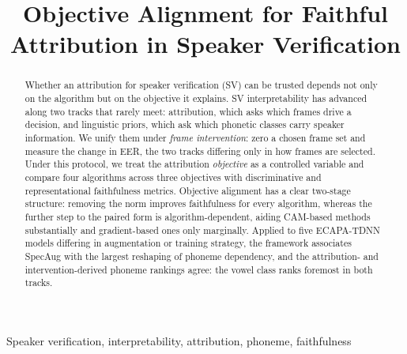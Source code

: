 \documentclass{article}
\title{Objective Alignment for Faithful Attribution in Speaker Verification}
\begin{document}
%
\maketitle
%
\begin{abstract}
Whether an attribution for speaker verification (SV) can be trusted depends not only on the algorithm but on the objective it explains. SV interpretability has advanced along two tracks that rarely meet: attribution, which asks which frames drive a decision, and linguistic priors, which ask which phonetic classes carry speaker information. We unify them under \emph{frame intervention}: zero a chosen frame set and measure the change in EER, the two tracks differing only in how frames are selected. Under this protocol, we treat the attribution \emph{objective} as a controlled variable and compare four algorithms across three objectives with discriminative and representational faithfulness metrics. Objective alignment has a clear two-stage structure: removing the norm improves faithfulness for every algorithm, whereas the further step to the paired form is algorithm-dependent, aiding CAM-based methods substantially and gradient-based ones only marginally. Applied to five ECAPA-TDNN models differing in augmentation or training strategy, the framework associates SpecAug with the largest reshaping of phoneme dependency, and the attribution- and intervention-derived phoneme rankings agree: the vowel class ranks foremost in both tracks.
\end{abstract}
%
\begin{keywords}
Speaker verification, interpretability, attribution, phoneme, faithfulness
\end{keywords}
%
\end{document}
